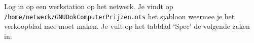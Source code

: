 Log in op een werkstation op het netwerk. Je vindt op \texttt{/home/netwerk/GNUDokComputerPrijzen.ots} het sjabloon weermee je het verkoopblad mee moet maken. Je vult op het tabblad `Spec' de volgende zaken in:

